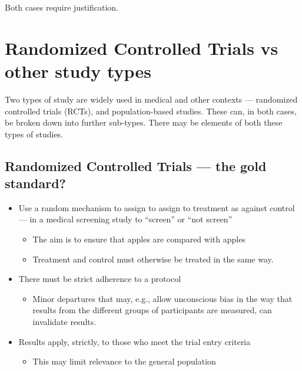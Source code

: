 \documentclass[
  10pt,
  b5paper]{book}
\providecommand{\tightlist}{%
  \setlength{\itemsep}{0pt}\setlength{\parskip}{0pt}}
\begin{document}
Both cases require justification.

\hypertarget{ss:rct}{%
\section{Randomized Controlled Trials vs other study types}\label{ss:rct}}

Two types of study are widely used in medical and other contexts ---
randomized controlled trials (RCTs), and population-based studies.
These can, in both cases, be broken down into further sub-types.
There may be elements of both these types of studies.

\hypertarget{randomized-controlled-trials-the-gold-standard}{%
\subsection*{Randomized Controlled Trials --- the gold standard?}\label{randomized-controlled-trials-the-gold-standard}}

\begin{itemize}
\tightlist
\item
  Use a random mechanism to assign to assign to treatment as
  against control --- in a medical screening study to
  ``screen'' or ``not screen''

  \begin{itemize}
  \tightlist
  \item
    The aim is to ensure that apples are compared with apples
  \item
    Treatment and control must otherwise be treated in the
    same way.
  \end{itemize}
\item
  There must be strict adherence to a protocol

  \begin{itemize}
  \tightlist
  \item
    Minor departures that may, e.g., allow unconscious bias
    in the way that results from the different groups of participants
    are measured, can invalidate results.
  \end{itemize}
\item
  Results apply, strictly, to those who meet the trial entry criteria

  \begin{itemize}
  \tightlist
  \item
    This may limit relevance to the general population
  \end{itemize}
\end{itemize}
\end{document}
